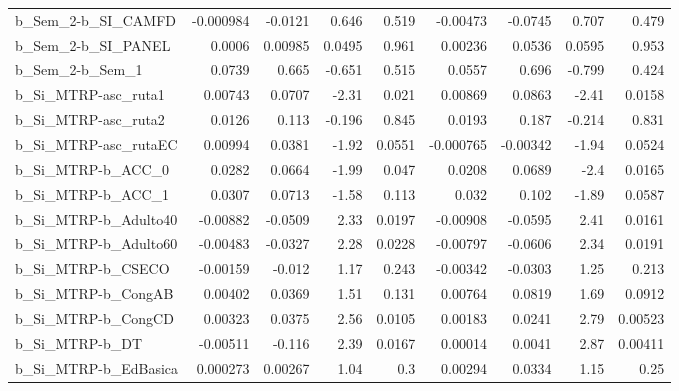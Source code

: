 \begin{tabular}{lrrrrrrrr}
b\_Sem\_2-b\_SI\_CAMFD         &   -0.000984 &      -0.0121 &     0.646 &    0.519 &   -0.00473 &     -0.0745 &        0.707 &         0.479 \\
b\_Sem\_2-b\_SI\_PANEL         &      0.0006 &      0.00985 &    0.0495 &    0.961 &    0.00236 &      0.0536 &       0.0595 &         0.953 \\
b\_Sem\_2-b\_Sem\_1            &      0.0739 &        0.665 &    -0.651 &    0.515 &     0.0557 &       0.696 &       -0.799 &         0.424 \\
b\_Si\_MTRP-asc\_ruta1        &     0.00743 &       0.0707 &     -2.31 &    0.021 &    0.00869 &      0.0863 &        -2.41 &        0.0158 \\
b\_Si\_MTRP-asc\_ruta2        &      0.0126 &        0.113 &    -0.196 &    0.845 &     0.0193 &       0.187 &       -0.214 &         0.831 \\
b\_Si\_MTRP-asc\_rutaEC       &     0.00994 &       0.0381 &     -1.92 &   0.0551 &  -0.000765 &    -0.00342 &        -1.94 &        0.0524 \\
b\_Si\_MTRP-b\_ACC\_0          &      0.0282 &       0.0664 &     -1.99 &    0.047 &     0.0208 &      0.0689 &         -2.4 &        0.0165 \\
b\_Si\_MTRP-b\_ACC\_1          &      0.0307 &       0.0713 &     -1.58 &    0.113 &      0.032 &       0.102 &        -1.89 &        0.0587 \\
b\_Si\_MTRP-b\_Adulto40       &    -0.00882 &      -0.0509 &      2.33 &   0.0197 &   -0.00908 &     -0.0595 &         2.41 &        0.0161 \\
b\_Si\_MTRP-b\_Adulto60       &    -0.00483 &      -0.0327 &      2.28 &   0.0228 &   -0.00797 &     -0.0606 &         2.34 &        0.0191 \\
b\_Si\_MTRP-b\_CSECO          &    -0.00159 &       -0.012 &      1.17 &    0.243 &   -0.00342 &     -0.0303 &         1.25 &         0.213 \\
b\_Si\_MTRP-b\_CongAB         &     0.00402 &       0.0369 &      1.51 &    0.131 &    0.00764 &      0.0819 &         1.69 &        0.0912 \\
b\_Si\_MTRP-b\_CongCD         &     0.00323 &       0.0375 &      2.56 &   0.0105 &    0.00183 &      0.0241 &         2.79 &       0.00523 \\
b\_Si\_MTRP-b\_DT             &    -0.00511 &       -0.116 &      2.39 &   0.0167 &    0.00014 &      0.0041 &         2.87 &       0.00411 \\
b\_Si\_MTRP-b\_EdBasica       &    0.000273 &      0.00267 &      1.04 &      0.3 &    0.00294 &      0.0334 &         1.15 &          0.25 \\

\end{tabular}
